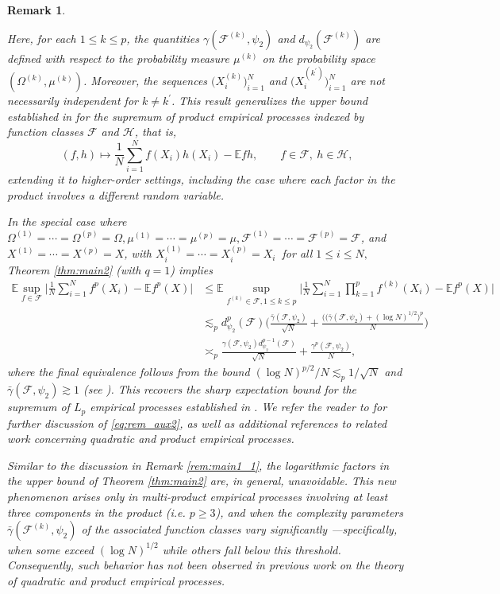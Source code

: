 \documentclass[numbers,webpdf,imaiai]{ima-authoring-template}
\theoremstyle{thmstyletwo}%
\newtheorem{remark}{Remark}%
\numberwithin{equation}{section}
\numberwithin{equation}{section}
\newcommand{\F}{\mathcal{F}}
\newcommand{\E}{\mathbb{E}}
\newcommand{\mcF}{\mathcal{F}}
\newcommand{\mcH}{\mathcal{H}}
\begin{document}
\begin{remark}\label{rem:general-multi-product-process} 
 
Here, for each $1\le k\le p$, the quantities $\gamma(\F^{(k)},\psi_2)$ and $d_{\psi_2}(\F^{(k)})$ are defined with respect to the probability measure $\mu^{(k)}$ on the probability space $(\Omega^{(k)},\mu^{(k)})$. Moreover, the sequences $\big(X_i^{(k)}\big)_{i=1}^N$ and $\big(X_i^{(k^{\prime})}\big)_{i=1}^{N}$ are not necessarily independent for $k\ne k^{\prime}$.
This result generalizes the upper bound established in \cite[Theorem 1.13]{mendelson2016upper} for the supremum of product empirical processes indexed by function classes $\mcF$ and $\mcH$, that is,
\[
(f,h) \mapsto \frac{1}{N} \sum_{i=1}^N f(X_i)h(X_i)-\E fh,\qquad f\in \F, \ h\in \mcH,
\]
extending it to higher-order settings, including the case where each factor in the product involves a different random variable.

In the special case where $\Omega^{(1)}=\cdots=\Omega^{(p)}=\Omega, \mu^{(1)}=\cdots=\mu^{(p)}=\mu, \F^{(1)}= \cdots=\F^{(p)}=\F$, and $X^{(1)}=\cdots =X^{(p)}=X$, with $X^{(1)}_i=\cdots = X^{(p)}_i=X_i \ $ for all $1\le i\le N,$ Theorem \ref{thm:main2} (with $q=1$) implies
\begin{align}\label{eq:rem_aux2}
\E \sup_{f\in \F} \bigg|\frac{1}{N}\sum_{i=1}^N f^p(X_i) -\E f^p(X)\bigg|&\le \E \sup_{f^{(k)}\in \F,1\le k\le p} \bigg|\frac{1}{N}\sum_{i=1}^N \prod_{k=1}^{p}f^{(k)}(X_i) -\E f^p(X)\bigg| \nonumber\\
&\lesssim_p d^p_{\psi_2}(\F)\bigg(\frac{\bar{\gamma}(\F,\psi_2)}{\sqrt{N}}+\frac{\big((\bar{\gamma}(\F,\psi_2)+(\log N)^{1/2}\big)^p}{N}\bigg) \nonumber\\
&\asymp_p \frac{\gamma(\F,\psi_2)d^{p-1}_{\psi_2}(\F)}{\sqrt{N}}+\frac{\gamma^{p}(\F,\psi_2)}{N},
\end{align}
where the final equivalence follows from the bound $(\log N)^{p/2}/N\lesssim_p 1/\sqrt{N}$ and $\bar{\gamma}(\F,\psi_2)\gtrsim 1$ (see \cite[Lemma 4.6]{al2025sharp}). This recovers the sharp expectation bound for the supremum of $L_p$ empirical processes established in \cite[Theorem 2.2]{al2025sharp}. We refer the reader to \cite{al2025sharp} for further discussion of \eqref{eq:rem_aux2}, as well as additional references to related work concerning quadratic and product empirical processes.

Similar to the discussion in Remark \ref{rem:main1_1}, the logarithmic factors in the upper bound of Theorem \ref{thm:main2} are, in general, unavoidable. This new phenomenon arises only in multi-product empirical processes involving at least three components in the product (i.e. $p\ge 3$), and when the complexity parameters $\bar{\gamma}(\F^{(k)},\psi_2)$ of the associated function classes vary significantly  ---specifically, when some exceed $(\log N)^{1/2}$ while others fall below this threshold. Consequently, such behavior has not been observed in previous work on the theory of quadratic and product empirical processes.
\end{remark}
\end{document}
